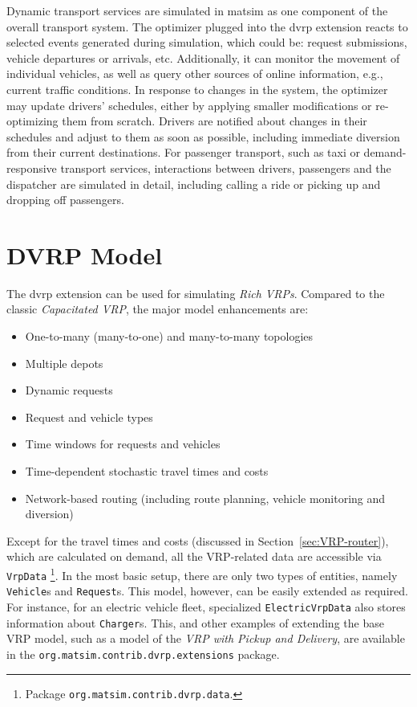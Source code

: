Dynamic transport services are simulated in \gls{matsim} as one component of the overall transport system. The optimizer plugged into the \gls{dvrp} extension reacts to selected events generated during simulation, which could be: request submissions, vehicle departures or arrivals, etc. Additionally, it can monitor the movement of individual vehicles, as well as query other sources of online information, e.g., current traffic conditions. In response to changes in the system, the optimizer may update drivers' schedules, either by applying smaller modifications or re-optimizing them from scratch. Drivers are notified about changes in their schedules and adjust to them as soon as possible, including immediate diversion from their current destinations. For passenger transport, such as taxi or demand-responsive transport services, interactions between drivers, passengers and the dispatcher are simulated in detail, including calling a ride or picking up and dropping off passengers.

\section{DVRP Model}
\label{sec:DVRP_model}
The \gls{dvrp} extension can be used for simulating \emph{Rich VRPs}. Compared to the classic \emph{Capacitated VRP}, the major model enhancements are:
%
\begin{itemize}
	\item One-to-many (many-to-one) and many-to-many topologies
	\item Multiple depots
	\item Dynamic requests
	\item Request and vehicle types
	\item Time windows for requests and vehicles
	\item Time-dependent stochastic travel times and costs
	\item Network-based routing (including route planning, vehicle monitoring and diversion)
\end{itemize}
%
Except for the travel times and costs (discussed in Section~\ref{sec:VRP-router}), which are calculated on demand, all the VRP-related data are accessible via \lstinline$VrpData$%
\footnote{
Package \lstinline$org.matsim.contrib.dvrp.data$.
}.
In the most basic setup, there are only two types of entities, namely \lstinline$Vehicle$s and \lstinline$Request$s. This model, however, can be easily extended as required. For instance, for an electric vehicle fleet, specialized \lstinline$ElectricVrpData$ also stores information about \lstinline$Charger$s. This, and other examples of extending the base VRP model, such as a model of the \emph{VRP with Pickup and Delivery}, are available in the \lstinline$org.matsim.contrib.dvrp.extensions$ package.

